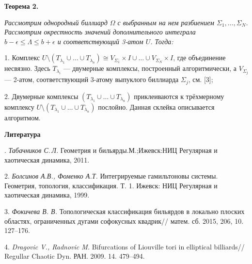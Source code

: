 \textbf{Теорема 2.} {\it
	Рассмотрим однородный биллиард $\Omega$ с выб\-ран\-ным на нем разбиением $\Sigma_1, \ldots, \Sigma_N$. Рассмотрим окрест\-ность значений дополнительного интеграла $b - \epsilon \leq \Lambda \leq b + \epsilon$ и соответствующий 3-атом $U$. Тогда:
	
1. Комплекс $U \setminus (T_{\lambda_1}\cup\ldots\cup T_{\lambda_n}) \cong V_{\Sigma_1} \times I \cup \ldots \cup V_{\Sigma_N} \times I$, где объединение несвязно. Здесь $T_{\lambda_i}$ --- двумерные комплексы, построенный алгорит\-мически, а $V_{\Sigma_j}$ --- 2-атом, соот\-вет\-ствующий 3-атому выпуклого бил\-лиарда $\Sigma_j$, см. [3];
	
2. Двумерные комплексы $(T_{\lambda_1} \cup \ldots \cup T_{\lambda_n})$ приклеиваются к трёхмерному комплексу $U \setminus (T_{\lambda_1} \cup \ldots \cup T_{\lambda_n})$ послойно. Данная склейка описывается алгоритмом.}







\smallskip \centerline {\bf Литература} . {\it Табачников С.\,Л.}
Геометрия и бильярды.М.;Ижевск:НИЦ  Регулярная и хаотическая динамика, 2011.

2. {\it Болсинов А.В., Фоменко А.Т.}
Интегрируемые гамиль\-тоновы системы. Геометрия, топология, классификация. Т. 1. Ижевск: НИЦ Регулярная и хаотическая динамика, 1999.

3. {\it Фокичева В. В.}
Топологическая классификация бильярдов в локально плоских областях, ограниченных дугами софокусных квадрик//
матем. сб. 2015, 206, 10. 127--176.

4. {\it Dragovic V., Radnovic M.}
Bifurcations of Liouville tori in elliptical billiards//
Regullar Chaotic Dyn. РАН. 2009. 14. 479--494.


